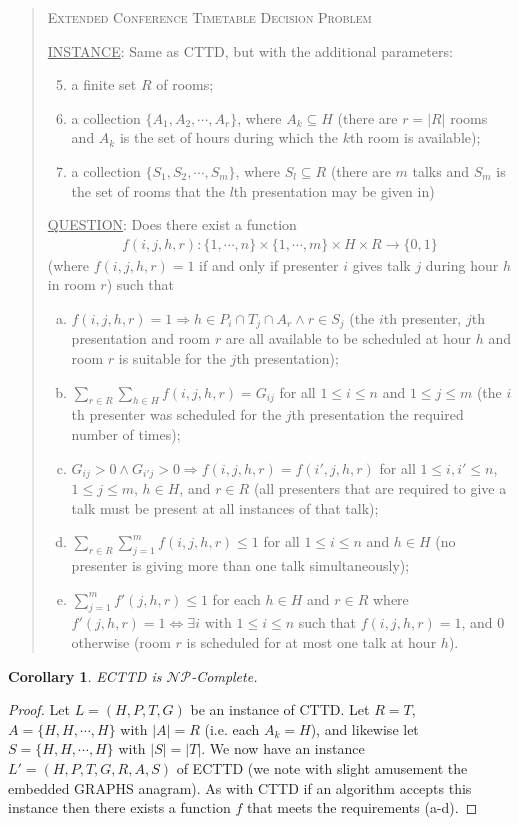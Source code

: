 \documentclass[]{article}
\newtheorem{cor}[thm]{Corollary}
\theoremstyle{definition}
\theoremstyle{remark}
\numberwithin{equation}{section}
\newcommand{\cNP}{$\mathcal{NP}$}
\begin{document}
\begin{quote}
	\textsc{Extended Conference Timetable Decision Problem}
	
	\underline{INSTANCE}: Same as CTTD, but with the additional parameters:
	\begin{enumerate}[1.]
		\setcounter{enumi}{4}
		\item a finite set $R$ of rooms;
		\item a collection $\{A_1,A_2,\cdots,A_r\}$, where $A_k \subseteq H$ (there are $r=|R|$ rooms and $A_k$ is the set of hours during which the $k$th room is available);
		\item a collection $\{S_1,S_2,\cdots,S_m\}$, where $S_l \subseteq R$ (there are $m$ talks and $S_m$ is the set of rooms that the $l$th presentation may be given in)
	\end{enumerate}
	\underline{QUESTION}: Does there exist a function 
	\begin{gather*}
		f(i,j,h,r) : \{1,\cdots,n\} \times \{1,\cdots,m\} \times H \times R \rightarrow \{0,1\}
	\end{gather*}
	(where $f(i,j,h,r)=1$ if and only if presenter $i$ gives talk $j$ during hour $h$ in room $r$) such that
	\begin{enumerate}[(a)]
		\item $f(i,j,h,r) = 1 \Rightarrow h \in P_i \cap T_j \cap A_r \land r \in S_j$ (the $i$th presenter, $j$th presentation and room $r$ are all available to be scheduled at hour $h$ and room $r$ is suitable for the $j$th presentation);
		\item $\sum\limits_{r \in R}\sum\limits_{h \in H} f(i,j,h,r) = G_{ij}$ for all $1 \le i \le n$ and $1 \le j \le m$ (the $i$th presenter was scheduled for the $j$th presentation the required number of times);
		\item $G_{ij} > 0 \land G_{i'j} > 0 \Rightarrow f(i,j,h,r)=f(i',j,h,r)$ for all $1 \le i,i' \le n$, $1 \le j \le m$, $h \in H$, and $r \in R$ (all presenters that are required to give a talk must be present at all instances of that talk);
		\item $\sum\limits_{r \in R}\sum\limits_{j=1}^m f(i,j,h,r) \le 1$ for all $1 \le i \le n$ and $h \in H$ (no presenter is giving more than one talk simultaneously);
		\item $\sum\limits_{j=1}^m f'(j,h,r) \le 1$ for each $h \in H$ and $r \in R$ where $f'(j,h,r) = 1 \iff \exists i \text{ with } 1 \le i \le n$ such that $f(i,j,h,r)=1$, and 0 otherwise (room $r$ is scheduled for at most one talk at hour $h$).
	\end{enumerate}
\end{quote}
\begin{cor}
	ECTTD is \cNP-Complete.
\end{cor}
\begin{proof}
	Let $L=(H,P,T,G)$ be an instance of CTTD. Let $R=T$, $A=\{H,H,\cdots,H\}$ with $|A|=R$ (i.e. each $A_k=H$), and  likewise let $S=\{H,H,\cdots,H\}$ with $|S|=|T|$. We now have an instance $L'=(H,P,T,G,R,A,S)$ of ECTTD (we note with slight amusement the embedded GRAPHS anagram). As with CTTD if an algorithm accepts this instance then there exists a function $f$ that meets the requirements (a-d).
\end{proof}
\end{document}
